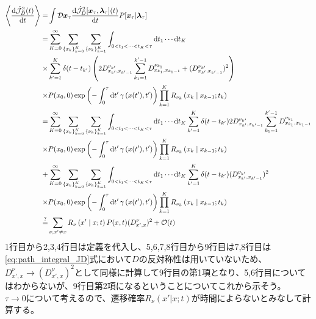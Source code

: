 \documentclass{ltjsarticle}
\begin{document}
\begin{align}
  \ev{\dv{\hat{\mathcal{J}}_D^2(t)}{t}}=&\int \mathcal{D}\bm{x}_\tau \dv{\hat{\mathcal{J}}_D^2[\bm{x}_\tau,\bm{\lambda}_\tau](t)}{t}P[\bm{x}_\tau|\bm{\lambda}_\tau]\\
  =&\sum_{K=0}^{\infty}\sum_{\lbrace x_k\rbrace_{k=0}^K}\sum_{\lbrace\nu_k\rbrace_{k=1}^K}\int_{0<t_1<\cdots<t_K<\tau}\dd{t_1}\cdots \dd{t_K}\\
  \times&\sum_{k'=1}^{K}\delta(t-t_{k'})\left(2D^{\nu_{k'}}_{x_{k'},x_{k'-1}}\sum_{k_1=1}^{k'-1}D^{\nu_{k_1}}_{x_{k_1},x_{k_1-1}}+(D^{\nu_{k'}}_{x_{k'},x_{k'-1}})^2\right)\\
  \times&P(x_0,0)\exp\left(-\int_0^\tau \dd{t'}\gamma\left(x(t'),t'\right)\right)\prod_{k=1}^K R_{\nu_k}\left(x_k\mid x_{k-1};t_k\right)\\
  =&\sum_{K=0}^{\infty}\sum_{\lbrace x_k\rbrace_{k=0}^K}\sum_{\lbrace\nu_k\rbrace_{k=1}^K}\int_{0<t_1<\cdots<t_K<\tau}\dd{t_1}\cdots \dd{t_K}\sum_{k'=1}^{K}\delta(t-t_{k'})2D^{\nu_{k'}}_{x_{k'},x_{k'-1}}\sum_{k_1=1}^{k'-1}D^{\nu_{k_1}}_{x_{k_1},x_{k_1-1}}\\
  \times&P(x_0,0)\exp\left(-\int_0^\tau \dd{t'}\gamma\left(x(t'),t'\right)\right)\prod_{k=1}^K R_{\nu_k}\left(x_k\mid x_{k-1};t_k\right)\\
  +&\sum_{K=0}^{\infty}\sum_{\lbrace x_k\rbrace_{k=0}^K}\sum_{\lbrace\nu_k\rbrace_{k=1}^K}\int_{0<t_1<\cdots<t_K<\tau}\dd{t_1}\cdots \dd{t_K}\sum_{k'=1}^{K}\delta(t-t_{k'})(D^{\nu_{k'}}_{x_{k'},x_{k'-1}})^2\\
  \times&P(x_0,0)\exp\left(-\int_0^\tau \dd{t'}\gamma\left(x(t'),t'\right)\right)\prod_{k=1}^K R_{\nu_k}\left(x_k\mid x_{k-1};t_k\right)\\
  \overset{?}{=}&\sum_{\nu,x'\neq x}R_{\nu}\left(x'\mid x;t\right)P(x,t)(D^{\nu}_{x',x})^2+\order{t}
  \label{eq:JD2_dot}
\end{align}
1行目から2,3,4行目は定義を代入し、5,6,7,8行目から9行目は7,8行目は\eqref{eq:path_integral_JD}式において$D$の反対称性は用いていないため、$D_{x',x}^\nu\to(D_{x',x}^\nu)^2$として同様に計算して9行目の第1項となり、5,6行目についてはわからないが、9行目第2項になるということについてこれから示そう。\\
$\tau\to 0$について考えるので、遷移確率$R_\nu(x'|x;t)$が時間によらないとみなして計算する。
\end{document}
